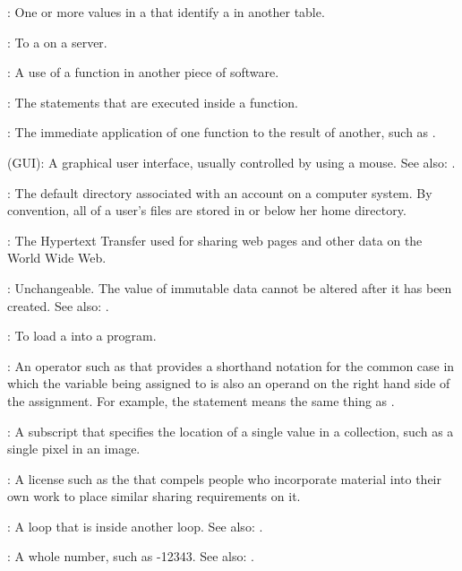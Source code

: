 :
One or more values in a
 that identify a
 in another table.

:
To  a  
on a server.

:
A use of a function in another piece of
software.

:
The statements that are executed inside a
function.

:
The immediate application of one function
to the result of another, such as .

 (GUI):
A graphical user interface,
usually controlled by using a mouse. See also:
.

:
The default directory associated with an
account on a computer system. By convention, all of a user's files are
stored in or below her home directory.

:
The Hypertext Transfer  used for sharing web pages and other data
on the World Wide Web.

:
Unchangeable. The value of immutable data cannot be
altered after it has been created. See also:
.

:
To load a  into a program.

:
An operator such as \code{+=} that
provides a shorthand notation for the common case in which the variable
being assigned to is also an operand on the right hand side of the
assignment. For example, the statement  means the same
thing as .

:
A subscript that specifies the location of a single
value in a collection, such as a single pixel in an image.

:
A license such as the
 that compels people
who incorporate material into their own work to place similar sharing
requirements on it.

:
A loop that is inside another loop. See also:
.

:
A whole number, such as -12343. See also:
.

